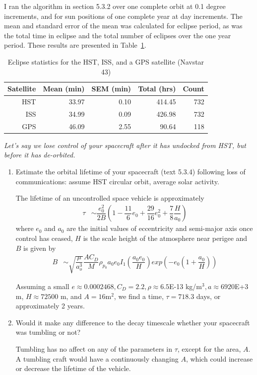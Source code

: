 \documentclass[onecolumn,10pt]{jhwhw}
\begin{document}
I ran the algorithm in section 5.3.2 over one complete orbit at 0.1 degree increments, and for sun positions of one complete year at day increments. The mean and standard error of the mean was calculated for eclipse period, as was the total time in eclipse and the total number of eclipses over the one year period. These results are presented in Table~\ref{p2table}.

\begin{table}[h]
\begin{center}
\begin{tabular}{rrrrr}
\toprule
Satellite & Mean (min) & SEM (min) & Total (hrs) & Count \\
\midrule
HST & 33.97 & 0.10 & 414.45 & 732 \\
ISS & 34.99 & 0.09 & 426.98 & 732 \\
GPS & 46.09 & 2.55 &  90.64 & 118 \\
\bottomrule
\end{tabular}
\end{center}
\caption{Eclipse statistics for the HST, ISS, and a GPS satellite (Navstar 43)}
\label{p2table}
\end{table}

\clearpage

\problem{}
\textit{Let’s say we lose control of your spacecraft after it has undocked from HST, but before it has de-orbited.}
\begin{enumerate}
\itemsep0em
\item Estimate the orbital lifetime of your spacecraft (text 5.3.4) following loss of communications: assume HST circular orbit, average solar activity.

The lifetime of an uncontrolled space vehicle is approximately
\begin{align*}
\tau &\sim \dfrac{e_0^2}{2B} \left( 1 - \dfrac{11}{6}e_0 + \dfrac{29}{16}e_0^2 + \dfrac{7}{8} \dfrac{H}{a_0} \right)
\end{align*}
where $e_0$ and $a_0$ are the initial values of eccentricity and semi-major axis once control has ceased, $H$ is the scale height of the atmosphere near perigee and $B$ is given by
\begin{align*}
B &\sim \sqrt{\dfrac{\mu}{a_o^3}} \dfrac{A C_D}{M} \rho_{p_0} a_0 e_0 I_1 \left( \dfrac{a_0 e_0}{H} \right) exp \left(-e_0 \left(1 + \dfrac{a_0}{H} \right) \right)
\end{align*}

Assuming a small $e \approx 0.0002468, C_D = 2.2, \rho \approx 6.5$E-13 kg/m$^3, a \approx 6920$E+3 m, $H \approx 72500$ m, and $A = 16$m$^2$, we find a time, $\tau = 718.3$ days, or approximately 2 years.

\item Would it make any difference to the decay timescale whether your spacecraft was tumbling or not?

Tumbling has no affect on any of the parameters in $\tau$, except for the area, $A$. A tumbling craft would have a continuously changing $A$, which could increase or decrease the lifetime of the vehicle.
\end{enumerate}
\end{document}
